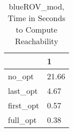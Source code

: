 \begin{table}
\caption{blueROV\_mod, Time in Seconds to Compute Reachability}
\label{blueROV_mod_states_time}
\begin{tabular}{ll}
\toprule
 & 1 \\
\midrule
no\_opt & 21.66 \\
last\_opt & 4.67 \\
first\_opt & 0.57 \\
full\_opt & 0.38 \\
\bottomrule
\end{tabular}
\end{table}

